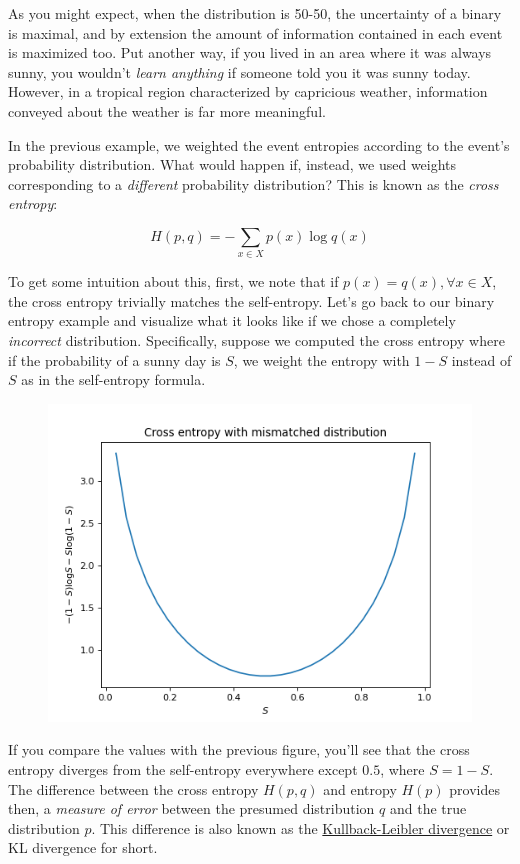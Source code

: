 \documentclass[
]{article}
\begin{document}
As you might expect, when the distribution is 50-50, the uncertainty of
a binary is maximal, and by extension the amount of information
contained in each event is maximized too. Put another way, if you lived
in an area where it was always sunny, you wouldn't \emph{learn anything}
if someone told you it was sunny today. However, in a tropical region
characterized by capricious weather, information conveyed about the
weather is far more meaningful.

In the previous example, we weighted the event entropies according to
the event's probability distribution. What would happen if, instead, we
used weights corresponding to a \emph{different} probability
distribution? This is known as the \emph{cross entropy}:

\[H(p, q) = -\sum_{x \in X} p(x)\log q(x)\]

To get some intuition about this, first, we note that if
\(p(x) = q(x), \forall x\in X\), the cross entropy trivially matches the
self-entropy. Let's go back to our binary entropy example and visualize
what it looks like if we chose a completely \emph{incorrect}
distribution. Specifically, suppose we computed the cross entropy where
if the probability of a sunny day is \(S\), we weight the entropy with
\(1 - S\) instead of \(S\) as in the self-entropy formula.

\begin{figure}
\centering
\includegraphics{plots/-6767785830879840565.png}
\caption{}
\end{figure}

If you compare the values with the previous figure, you'll see that the
cross entropy diverges from the self-entropy everywhere except \(0.5\),
where \(S = 1 - S\). The difference between the cross entropy
\(H(p, q)\) and entropy \(H(p)\) provides then, a \emph{measure of
error} between the presumed distribution \(q\) and the true distribution
\(p\). This difference is also known as the
\href{https://en.wikipedia.org/wiki/Kullback\%E2\%80\%93Leibler_divergence}{Kullback-Leibler
divergence} or KL divergence for short.
\end{document}
